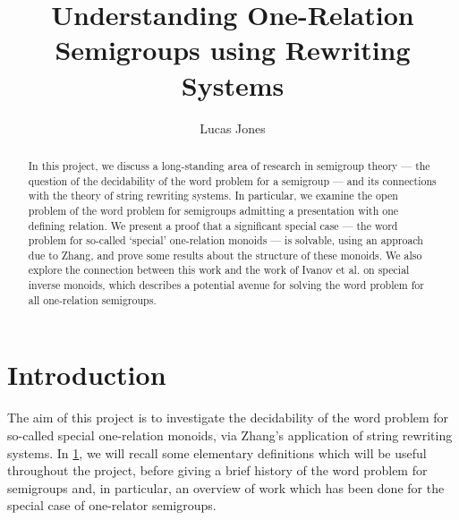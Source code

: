 \documentclass[noindex,noinsetproof,emphthm,12pt]{lmaths}
\title{Understanding One-Relation Semigroups using Rewriting Systems}
\author{Lucas Jones}
\newcommand{\frontmatter}{\pagenumbering{roman}}
\newcommand{\mainmatter}{\pagenumbering{arabic}}
\begin{document}
\vfill
\maketitle
\vfill
\thispagestyle{empty}
\clearpage

\frontmatter

\begin{comment}
\clearpage
I certify that this project report has been written by me, is a record of work carried out by me, and is essentially different from work undertaken for any other purpose or assessment.

\vspace{1.5em}
Signed: \rule[-2pt]{15em}{1pt} \\*[0.8em]
\hphantom{Signed: }Lucas Jones
\end{comment}


\clearpage


\begin{abstract}
	In this project, we discuss a long-standing area of research in semigroup theory --- the question of the decidability of the word problem for a semigroup --- and its connections with the theory of string rewriting systems. In particular, we examine the open problem of the word problem for semigroups admitting a presentation with one defining relation. We present a proof that a significant special case --- the word problem for so-called `special' one-relation monoids --- is solvable, using an approach due to Zhang, and prove some results about the structure of these monoids. We also explore the connection between this work and the work of Ivanov et al. on special inverse monoids, which describes a potential avenue for solving the word problem for all one-relation semigroups.
\end{abstract}
\clearpage

\tableofcontents

\clearpage

\mainmatter
\section{Introduction} \label{sec:intro}

The aim of this project is to investigate the decidability of the word problem for so-called special one-relation monoids, via Zhang's application of string rewriting systems. In \cref{sec:intro}, we will recall some elementary definitions which will be useful throughout the project, before giving a brief history of the word problem for semigroups and, in particular, an overview of work which has been done for the special case of one-relator semigroups.
\end{document}

